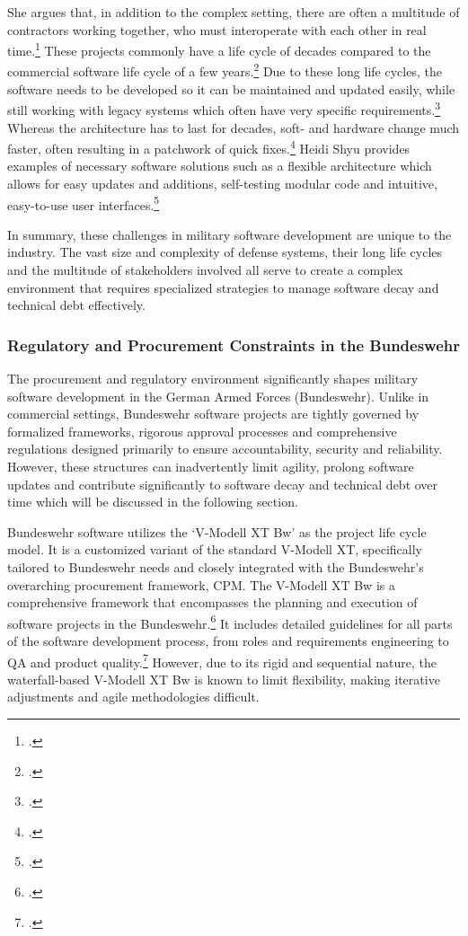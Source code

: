 She argues that, in addition to the complex setting, there are often a multitude of contractors working together, who must interoperate with each other in real time.\footcite[11]{shyu2017military}
These projects commonly have a life cycle of decades compared to the commercial software life cycle of a few years.\footcite[14]{shyu2017military}
Due to these long life cycles, the software needs to be developed so it can be maintained and updated easily, while still working with legacy systems
which often have very specific requirements.\footcite[14]{shyu2017military}
Whereas the architecture has to last for decades, soft- and hardware change much faster, often resulting in a patchwork of quick fixes.\footcite[15]{shyu2017military}
Heidi Shyu provides examples of necessary software solutions such as a flexible architecture which allows for easy updates and additions, self-testing modular code and intuitive, easy-to-use user interfaces.\footcite[17]{shyu2017military}

In summary, these challenges in military software development are unique to the industry. The vast size and complexity of defense systems,
their long life cycles and the multitude of stakeholders involved all serve to create a complex environment that requires specialized strategies to manage software decay and technical debt effectively.

\subsubsection{Regulatory and Procurement Constraints in the Bundeswehr}
The procurement and regulatory environment significantly shapes military software development in the German Armed Forces (Bundeswehr). Unlike in commercial settings,
Bundeswehr software projects are tightly governed by formalized frameworks, rigorous approval processes and comprehensive regulations designed primarily to ensure 
accountability, security and reliability. However, these structures can inadvertently limit agility, prolong software updates and contribute significantly to software decay
and technical debt over time which will be discussed in the following section.

Bundeswehr software utilizes the `V-Modell XT Bw' as the project life cycle model. It is a customized variant of the standard V-Modell XT, specifically tailored to Bundeswehr needs and closely integrated with the 
Bundeswehr's overarching procurement framework, \ac{CPM}.
The V-Modell XT Bw is a comprehensive framework that encompasses the planning and execution of software projects in the Bundeswehr.\footcite[6]{bundeswehrVModellXTBw2013}
It includes detailed guidelines for all parts of the software development process, from roles and requirements engineering to \ac{QA} and product quality.\footcite[pp. 20-21]{bundeswehrVModellXTBw2013}
However, due to its rigid and sequential nature, the waterfall-based V-Modell XT Bw is known to limit flexibility, making iterative adjustments and agile methodologies difficult.

